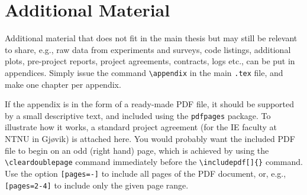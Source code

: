 \chapter{Additional Material}
\label{app:additional}

Additional material that does not fit in the main thesis but may still be relevant to share, e.g., raw data from experiments and surveys, code listings, additional plots, pre-project reports, project agreements, contracts, logs etc., can be put in appendices. Simply issue the command \texttt{\textbackslash appendix} in the main \texttt{.tex} file, and make one chapter per appendix.

If the appendix is in the form of a ready-made PDF file, it should be supported by a small descriptive text, and included using the \texttt{pdfpages} package. To illustrate how it works, a standard project agreement (for the IE faculty at NTNU in Gjøvik) is attached here. You would probably want the included PDF file to begin on an odd (right hand) page, which is achieved by using the \texttt{\textbackslash cleardoublepage} command immediately before the \texttt{\textbackslash includepdf[]\{\}} command. Use the option \texttt{[pages=-]} to include all pages of the PDF document, or, e.g., \texttt{[pages=2-4]} to include only the given page range.

\cleardoublepage
